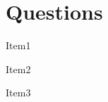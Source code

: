 

\chapter{Questions}



\begin{todolist}
		\item[\done] Item1
		\item Item2
		\item[\wontfix] Item3
\end{todolist}